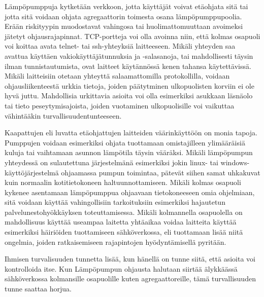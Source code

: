   Lämpöpumppuja kytketään verkkoon, jotta käyttäjät voivat etäohjata sitä tai jotta sitä voidaan ohjata agregaattorin toimesta osana lämpöpumppupoolia. Erään riskityypin muodostavat vahingosa tai huolimattomuuttaan avoimeksi jätetyt ohjausrajapinnat. TCP-portteja voi olla avoinna niin, että kolmas osapuoli voi koittaa avata telnet- tai ssh-yhteyksiä laitteeseen. Mikäli yhteyden saa avattua käyttäen vakiokäyttäjätunnuksia ja -salasanoja,  tai mahdollisesti täysin ilman tunnistautumista, ovat laitteet käytännössä kenen tahansa käytettävissä. Mikäli laitteisiin otetaan yhteyttä salaamattomilla protokollilla, voidaan ohjausliikenteestä urkkia tietoja, joiden päätytminen ulkopuolisten korviin ei ole hyvä juttu. Mahdollisia urkittavia asioita voi olla esimerkiksi asukkaan läsnäolo tai tieto peseytymisajoista, joiden vuotaminen ulkopuolisille voi vaikuttaa vähintääkin turvallisuudentunteeseen.

  Kaapattujen eli luvatta etäohjattujen laitteiden väärinkäyttöön on monia tapoja. Pumppujen voidaan esimerkiksi ohjata tuottamaan omistajilleen ylimääräisiä kuluja tai vaihtamaan asunnon lämpötila täysin vääräksi. Mikäli lämpöpumpun yhteydessä on sulautettuna järjestelmänä esimerkiksi jokin linux- tai windows-käyttöjärjestelmä ohjaamassa pumpun toimintaa, pätevät siihen samat uhkakuvat kuin normaalin kotitietokoneen haltuunnottamiseen. Mikäli kolmas osapuoli kykenee asentamaan lämpöpumppua ohjaavaan tietokoneeseen omia ohjelmiaan, sitä voidaan käyttää vahingollisiin tarkoituksiin esimerkiksi hajautetun palvelunestohyökkäyksen toteuttamisessa. Mikäli kolmannella osapuolella on mahdollisuus käyttää useampaa laitetta yhtäaikaa voidaa laitteita käyttää esimerkiksi häiriöiden tuottamiseen sähköverkossa, eli tuottamaan lisää niitä ongelmia, joiden ratkaisemiseen rajapintojen hyödyntämisellä pyritään.

  Ihmisen turvalisuuden tunnetta lisää, kun hänellä on tunne siitä, että asioita voi kontrolloida itse. Kun Lämpöpumpun ohjausta halutaan siirtää älykkäässä sähköverkossa kolmansille osapuolille kuten agregaattoreille, tämä turvallisuuden tunne saattaa horjua.

